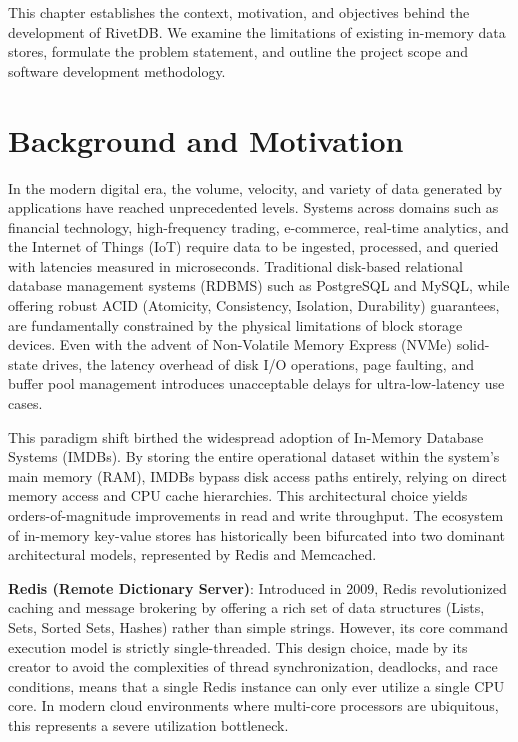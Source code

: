 
This chapter establishes the context, motivation, and objectives behind the development of RivetDB. We examine the limitations of existing in-memory data stores, formulate the problem statement, and outline the project scope and software development methodology.

\section{Background and Motivation}
In the modern digital era, the volume, velocity, and variety of data generated by applications have reached unprecedented levels. Systems across domains such as financial technology, high-frequency trading, e-commerce, real-time analytics, and the Internet of Things (IoT) require data to be ingested, processed, and queried with latencies measured in microseconds. Traditional disk-based relational database management systems (RDBMS) such as PostgreSQL and MySQL, while offering robust ACID (Atomicity, Consistency, Isolation, Durability) guarantees, are fundamentally constrained by the physical limitations of block storage devices. Even with the advent of Non-Volatile Memory Express (NVMe) solid-state drives, the latency overhead of disk I/O operations, page faulting, and buffer pool management introduces unacceptable delays for ultra-low-latency use cases.

This paradigm shift birthed the widespread adoption of In-Memory Database Systems (IMDBs). By storing the entire operational dataset within the system's main memory (RAM), IMDBs bypass disk access paths entirely, relying on direct memory access and CPU cache hierarchies. This architectural choice yields orders-of-magnitude improvements in read and write throughput. The ecosystem of in-memory key-value stores has historically been bifurcated into two dominant architectural models, represented by Redis and Memcached.

\textbf{Redis (Remote Dictionary Server)}: Introduced in 2009, Redis revolutionized caching and message brokering by offering a rich set of data structures (Lists, Sets, Sorted Sets, Hashes) rather than simple strings. However, its core command execution model is strictly single-threaded. This design choice, made by its creator to avoid the complexities of thread synchronization, deadlocks, and race conditions, means that a single Redis instance can only ever utilize a single CPU core. In modern cloud environments where multi-core processors are ubiquitous, this represents a severe utilization bottleneck.

